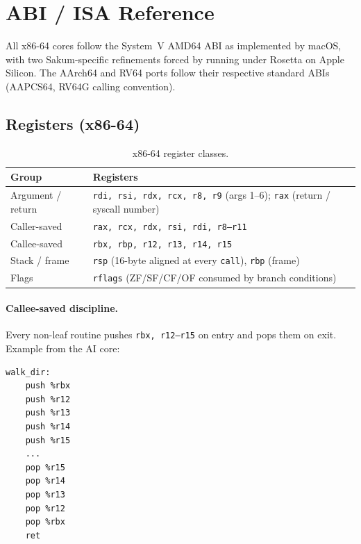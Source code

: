 \section{ABI / ISA Reference}\label{ch:abi}

All x86-64 cores follow the System~V AMD64 ABI as implemented by macOS, with
two Sakum-specific refinements forced by running under Rosetta on Apple
Silicon.  The AArch64 and RV64 ports follow their respective standard ABIs
(AAPCS64, RV64G calling convention).

\subsection{Registers (x86-64)}

\begin{table}[H]
\centering
\begin{tabularx}{\textwidth}{lX}
\toprule
Group & Registers \\
\midrule
Argument / return & \texttt{rdi, rsi, rdx, rcx, r8, r9} (args 1--6);
  \texttt{rax} (return / syscall number) \\
Caller-saved & \texttt{rax, rcx, rdx, rsi, rdi, r8--r11} \\
Callee-saved & \texttt{rbx, rbp, r12, r13, r14, r15} \\
Stack / frame & \texttt{rsp} (16-byte aligned at every \texttt{call}),
  \texttt{rbp} (frame) \\
Flags & \texttt{rflags} (ZF/SF/CF/OF consumed by branch conditions) \\
\bottomrule
\end{tabularx}
\caption{x86-64 register classes.}
\end{table}

\paragraph{Callee-saved discipline.} Every non-leaf routine pushes
\texttt{rbx, r12--r15} on entry and pops them on exit.  Example from the AI
core:
\begin{lstlisting}[language=SakumAsm,caption={Callee-saved push/pop in walk\_dir (assembly/sakum\_ai.s:196).}]
walk_dir:
    push %rbx
    push %r12
    push %r13
    push %r14
    push %r15
    ...
    pop %r15
    pop %r14
    pop %r13
    pop %r12
    pop %rbx
    ret
\end{lstlisting}

